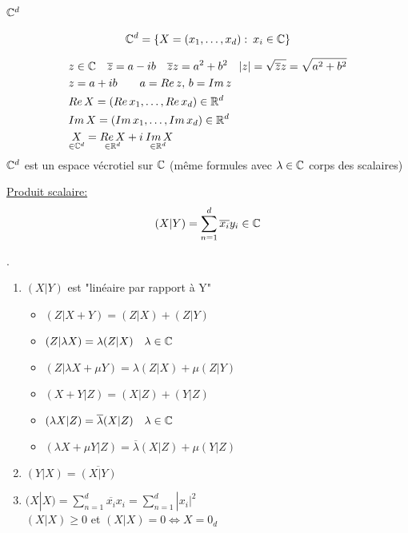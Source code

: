 \documentclass[a4paper]{report}
\begin{document}
\section{$\mathbb{C}^d$}
\begin{definition}
    \[
        \mathbb{C}^d = \{ X = (x_1, \ldots, x_d): \: x_i \in \mathbb{C}\}
    \] 
\end{definition}
\begin{align*}
    &z \in \mathbb{C} \quad \overline{z} = a - ib \quad \overline{z}z = a^2 + b^2 \quad |z| = \sqrt{\overline{z}z} = \sqrt{a^2 + b^2}  \\
    &z = a + ib \qquad a = Re\,z,\,b = Im\,z\\
    &Re\,X = (Re\,x_1, \ldots, Re\,x_d) \in \mathbb{R}^d\\
    &Im\,X = (Im\,x_1, \ldots, Im\,x_d) \in \mathbb{R}^d\\
    &\underset{\in \mathbb{C}^d}{X} = \underset{\in \mathbb{R}^d}{Re\,X} + i\underset{\in \mathbb{R}^d}{\:Im\,X}\\
\end{align*}
$\mathbb{C}^d$ est un espace vécrotiel sur  $\mathbb{C}$ (même formules avec $\lambda \in \mathbb{C}$ corps des scalaires)
\begin{definition}
    \underline{Produit scalaire:}
    \[
        (X|Y) = \sum_{n=1}^{d} \overline{x_i}y_i \in \mathbb{C}
    \] 
\end{definition}
\begin{prop}
   . 
   \begin{enumerate}
       \item $(X|Y)$ est "linéaire par rapport à Y"
           \begin{itemize}
               \item $(Z|X + Y) = (Z|X) + (Z|Y)$
               \item $(Z|\lambda X) = \lambda(Z|X) \quad \lambda \in \mathbb{C}$
               \item  $(Z|\lambda X + \mu Y) = \lambda(Z|X) + \mu(Z|Y)$
               \item  $(X + Y|Z) = (X|Z) + (Y|Z)$
               \item $(\lambda X|Z) = \overline{\lambda}(X|Z) \quad \lambda \in \mathbb{C}$
               \item $(\lambda X + \mu Y|Z) = \overline{\lambda}(X|Z) + \mu(Y|Z)$
           \end{itemize}
       \item $(Y|X) = \overline{(X|Y)}$
       \item $(X|X) = \sum_{n=1}^{d} \overline{x_i}x_i = \sum_{n=1}^{d} |x_i|^2$\\
           $(X|X) \ge 0$ et $(X|X) = 0 \iff X = 0_d$
   \end{enumerate}
\end{prop}
\end{document}
